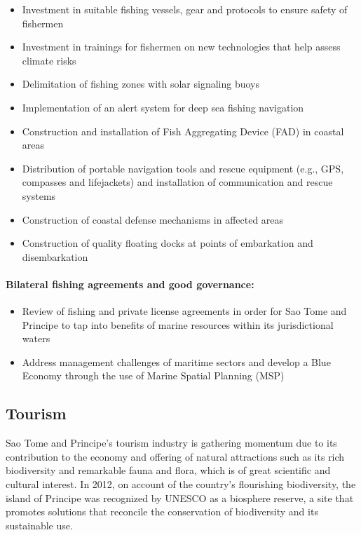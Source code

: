 \documentclass[
]{book}
\providecommand{\tightlist}{%
  \setlength{\itemsep}{0pt}\setlength{\parskip}{0pt}}
\begin{document}
\begin{itemize}
\tightlist
\item
  Investment in suitable fishing vessels, gear and protocols to ensure safety of fishermen
\item
  Investment in trainings for fishermen on new technologies that help assess climate risks
\item
  Delimitation of fishing zones with solar signaling buoys
\item
  Implementation of an alert system for deep sea fishing navigation
\item
  Construction and installation of Fish Aggregating Device (FAD) in coastal areas
\item
  Distribution of portable navigation tools and rescue equipment (e.g., GPS, compasses and lifejackets) and installation of communication and rescue systems
\item
  Construction of coastal defense mechanisms in affected areas
\item
  Construction of quality floating docks at points of embarkation and disembarkation
\end{itemize}

\hypertarget{bilateral-fishing-agreements-and-good-governance-1}{%
\paragraph{Bilateral fishing agreements and good governance:}\label{bilateral-fishing-agreements-and-good-governance-1}}

\begin{itemize}
\tightlist
\item
  Review of fishing and private license agreements in order for Sao Tome and Principe to tap into benefits of marine resources within its jurisdictional waters
\item
  Address management challenges of maritime sectors and develop a Blue Economy through the use of Marine Spatial Planning (MSP)
\end{itemize}

\hypertarget{tourism-1}{%
\subsection{Tourism}\label{tourism-1}}

Sao Tome and Principe's tourism industry is gathering momentum due to its contribution to the economy and offering of natural attractions such as its rich biodiversity and remarkable fauna and flora, which is of great scientific and cultural interest. In 2012, on account of the country's flourishing biodiversity, the island of Principe was recognized by UNESCO as a biosphere reserve, a site that promotes solutions that reconcile the conservation of biodiversity and its sustainable use.
\end{document}
